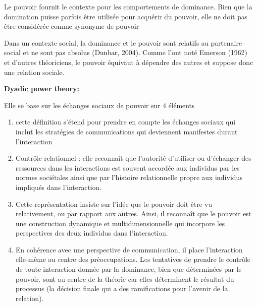 Le pouvoir fournit le contexte pour les comportements de dominance. Bien que la domination puisse parfois être utilisée pour acquérir du pouvoir, elle ne doit pas être considérée comme synonyme de pouvoir %

Dans un contexte social, la dominance et le pouvoir sont relatifs au partenaire social et ne sont pas absolus (Dunbar, 2004). 
Comme l'ont noté Emerson (1962) et d'autres théoriciens, le pouvoir équivaut à dépendre des autres et suppose donc une relation sociale.

\textbf{Dyadic power theory:}


Elle se base sur les échanges sociaux de pouvoir sur 4 éléments

\begin{enumerate}
	\item cette définition s'étend pour prendre en compte les échanges sociaux qui inclut les stratégies de communications qui deviennent manifestes durant l'interaction
	\item Contrôle relationnel : elle reconnaît que l'autorité d'utiliser ou d'échanger des ressources dans les interactions est souvent accordée aux individus par les normes sociétales ainsi que par l'histoire relationnelle propre aux individus impliqués dans l'interaction.
	
	\item Cette représentation insiste sur l'idée que le pouvoir doit être vu relativement, ou par rapport aux autres. Ainsi, il reconnaît que le pouvoir est une construction dynamique et multidimensionnelle qui incorpore les perspectives des deux individus dans l'interaction.
	\item En cohérence avec une perspective de communication, il place l'interaction elle-même au centre des préoccupations. Les tentatives de prendre le contrôle de toute interaction donnée par la dominance, bien que déterminées par le pouvoir, sont au centre de la théorie car elles déterminent le résultat du processus  (la décision finale qui a des ramifications pour l'avenir de la relation).
\end{enumerate}



